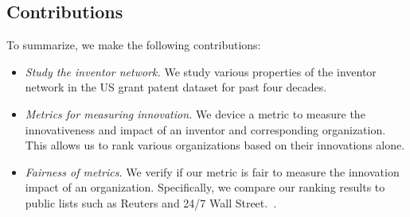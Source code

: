 \subsection{Contributions}

To summarize, we make the following contributions:

	\begin{itemize} 
		\item {\em Study the inventor network.} We study various properties of the inventor network in the US grant patent dataset for past four decades.  
		\item {\em Metrics for measuring innovation.} We device a metric to measure the innovativeness and impact of an inventor and corresponding organization. This allows us to rank various organizations based on their innovations alone. 
		\item {\em Fairness of metrics.} We verify if our metric is fair to measure the innovation impact of an organization. Specifically, we compare our ranking results to public lists such as Reuters and 24/7 Wall Street.~\cite{top100, 247wallst}.
	\end{itemize}